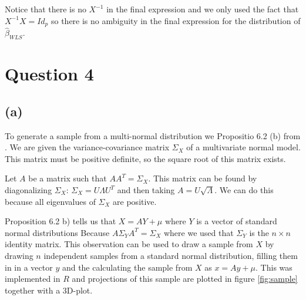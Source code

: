 \documentclass[a4paper]{article}
\begin{document}

Notice that there is no $X^{-1}$ in the final expression and we only used the fact that $X^{-1}X=Id_p$ so there is no ambiguity in the final expression for the distribution of $\hat{\beta}_{WLS}$.


\newpage
\section*{Question 4}
\noindent {}

\subsection*{(a)}
\noindent {}

To generate a sample from a multi-normal distribution we Propositio 6.2 (b) from \cite{course-notes}. We are given the variance-covariance matrix $\Sigma_X$ of a multivariate normal model. This matrix must be positive definite, so the square root of this matrix exists. 

Let $A$ be a matrix such that $AA^T=\Sigma_X$. This matrix can be found by diagonalizing $\Sigma_X$: $\Sigma_X=U\Lambda U^T$ and then taking $A = U \sqrt{\Lambda}$. We can do this because all eigenvalues of $\Sigma_X$ are positive.

Proposition 6.2 b) tells us that $X = AY + \mu$ where $Y$ is a vector of standard normal distributions Because $A\Sigma_YA^T=\Sigma_X$ where we used that $\Sigma_Y$ is the $n\times n$ identity matrix.
This observation can be used to draw a sample from $X$ by drawing $n$ independent samples from a standard normal distribution, filling them in in a vector $y$ and the calculating the sample from $X$ as $x=Ay+\mu$. This was implemented in $R$ and projections of this sample are plotted in figure \ref{fig:sample} together with a 3D-plot.
\end{document}
